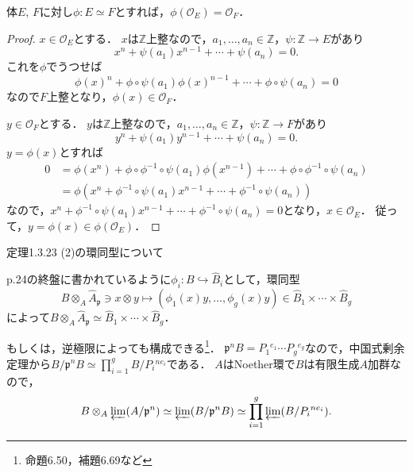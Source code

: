 \begin{screen}
  \begin{lem}
    \label{iso_field_integral_closure}
    体$E$, $F$に対し$\phi \colon E \simeq F$とすれば，$\phi(\mathcal{O}_E) = \mathcal{O}_F$．
  \end{lem}
\end{screen}
\begin{proof}
  $x\in \mathcal{O}_E$とする．
  $x$は$\mathbb{Z}$上整なので，$a_1, \ldots, a_n \in \mathbb{Z}$，$\psi\colon\mathbb{Z}\to E$があり
  \[x^n + \psi(a_1)x^{n-1} + \cdots + \psi(a_n) = 0.\]
  これを$\phi$でうつせば
  \[\phi(x)^n + \phi\circ\psi(a_1)\phi(x)^{n-1} + \cdots + \phi\circ\psi(a_n) = 0\]
  なので$F$上整となり，$\phi(x) \in \mathcal{O}_F$．

  $y \in \mathcal{O}_F$とする．
  $y$は$\mathbb{Z}$上整なので，$a_1, \ldots, a_n \in \mathbb{Z}$，$\psi\colon\mathbb{Z}\to F$があり
  \[y^n + \psi(a_1)y^{n-1} + \cdots + \psi(a_n) = 0.\]
  $y = \phi(x)$とすれば
  \begin{align*}
    0 &= \phi(x^n) + \phi\circ\phi^{-1}\circ\psi(a_1) \phi(x^{n-1}) + \cdots + \phi\circ\phi^{-1}\circ\psi(a_n) \\
      &= \phi \left( x^n + \phi^{-1}\circ\psi(a_1) x^{n-1} + \cdots + \phi^{-1}\circ\psi(a_n) \right)
  \end{align*}
  なので，$x^n + \phi^{-1}\circ\psi(a_1) x^{n-1} + \cdots + \phi^{-1}\circ\psi(a_n) = 0$となり，$x \in \mathcal{O}_E$．
  従って，$y = \phi(x) \in \phi(\mathcal{O}_E)$．
\end{proof}

\begin{screen}
  \begin{thm}
    \label{Thm_1_3_23_2}
    定理1.3.23 (2)の環同型について
  \end{thm}
\end{screen}
p.24の終盤に書かれているように$\phi_i\colon B\hookrightarrow\widehat{B}_i$として，環同型
\[B\otimes_A\widehat{A}_\mathfrak{p}\ni x \otimes y\mapsto(\phi_1(x)y, \ldots, \phi_g(x)y)\in\widehat{B}_1\times\cdots\times\widehat{B}_g\]
によって$B\otimes_A\widehat{A}_\mathfrak{p}\simeq\widehat{B}_1\times\cdots\times\widehat{B}_g$．

もしくは，逆極限によっても構成できる\footnote{\cite{加藤和也2005数論}命題6.50，補題6.69など}．
$\mathfrak{p}^nB = P_1{}^{e_1} \cdots P_g{}^{e_g}$なので，中国式剰余定理から$B/\mathfrak{p}^nB \simeq \prod_{i = 1}^g B/P_i{}^{ne_i}$である．
$A$はNoether環で$B$は有限生成$A$加群なので，
\[ B \otimes_A \varprojlim (A/\mathfrak{p}^n) \simeq \varprojlim(B/\mathfrak{p}^nB) \simeq \prod_{i = 1}^g \varprojlim (B/P_i{}^{ne_i}). \]

